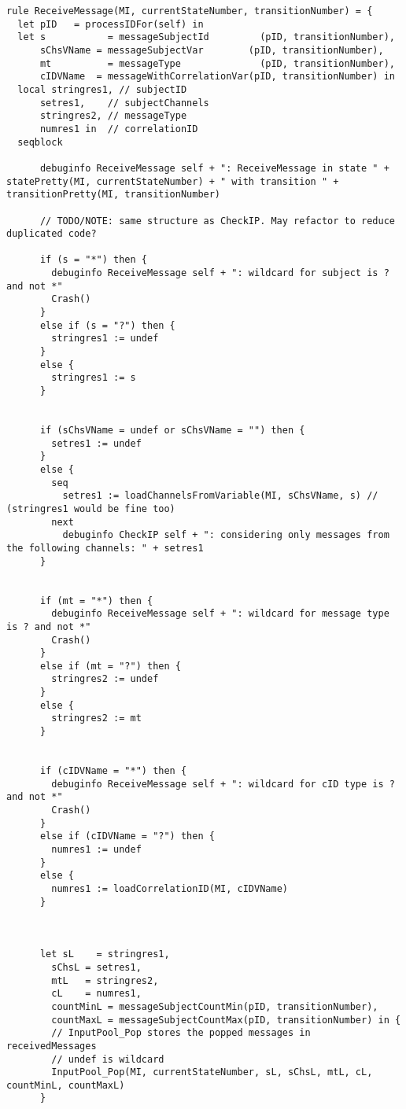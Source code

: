 \begin{listing}[H]
\begin{verbatim}
rule ReceiveMessage(MI, currentStateNumber, transitionNumber) = {
  let pID   = processIDFor(self) in
  let s           = messageSubjectId         (pID, transitionNumber),
      sChsVName = messageSubjectVar        (pID, transitionNumber),
      mt          = messageType              (pID, transitionNumber),
      cIDVName  = messageWithCorrelationVar(pID, transitionNumber) in
  local stringres1, // subjectID
      setres1,    // subjectChannels
      stringres2, // messageType
      numres1 in  // correlationID
  seqblock

      debuginfo ReceiveMessage self + ": ReceiveMessage in state " + statePretty(MI, currentStateNumber) + " with transition " + transitionPretty(MI, transitionNumber)

      // TODO/NOTE: same structure as CheckIP. May refactor to reduce duplicated code?

      if (s = "*") then {
        debuginfo ReceiveMessage self + ": wildcard for subject is ? and not *"
        Crash()
      }
      else if (s = "?") then {
        stringres1 := undef
      }
      else {
        stringres1 := s
      }


      if (sChsVName = undef or sChsVName = "") then {
        setres1 := undef
      }
      else {
        seq
          setres1 := loadChannelsFromVariable(MI, sChsVName, s) // (stringres1 would be fine too)
        next
          debuginfo CheckIP self + ": considering only messages from the following channels: " + setres1
      }


      if (mt = "*") then {
        debuginfo ReceiveMessage self + ": wildcard for message type is ? and not *"
        Crash()
      }
      else if (mt = "?") then {
        stringres2 := undef
      }
      else {
        stringres2 := mt
      }


      if (cIDVName = "*") then {
        debuginfo ReceiveMessage self + ": wildcard for cID type is ? and not *"
        Crash()
      }
      else if (cIDVName = "?") then {
        numres1 := undef
      }
      else {
        numres1 := loadCorrelationID(MI, cIDVName)
      }



      let sL    = stringres1,
        sChsL = setres1,
        mtL   = stringres2,
        cL    = numres1,
        countMinL = messageSubjectCountMin(pID, transitionNumber),
        countMaxL = messageSubjectCountMax(pID, transitionNumber) in {
        // InputPool_Pop stores the popped messages in receivedMessages
        // undef is wildcard
        InputPool_Pop(MI, currentStateNumber, sL, sChsL, mtL, cL, countMinL, countMaxL)
      }


\end{verbatim}
\end{listing}
